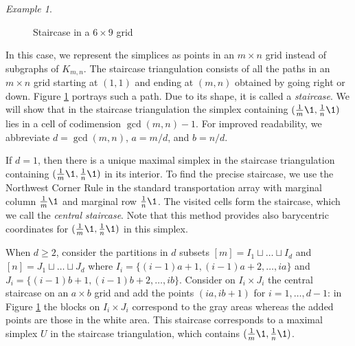 \documentclass[a4paper,12pt]{amsart}
\theoremstyle{remark}
\newtheorem{example}[theorem]{Example}
\begin{document}
\begin{example}
\begin{figure}[th]
{}
    \caption{%
      Staircase in a $6\times 9$ grid}
    \label{fig:staircase}
  \end{figure}

  In this case, we represent the simplices as points in an $m{\times}n$ grid instead of subgraphs of $K_{m,n}$.
  The staircase triangulation consists of all the paths in an $m{\times}n$ grid starting at $(1,1)$ and ending at $(m,n)$ obtained by going right or down.
  Figure \ref{fig:staircase} portrays such a path.
  Due to its shape, it is called a \emph{staircase}.
  We will show that in the staircase triangulation the simplex containing $(\tfrac{1}{m}\1,\tfrac{1}{n}\1)$ lies in a cell of codimension $\gcd(m,n)-1$.
  For improved readability, we abbreviate $d=\gcd(m,n)$, $a={m}/{d}$, and $b={n}/{d}$.
  
  If $d=1$, then there is a unique maximal simplex in the staircase triangulation containing $(\tfrac{1}{m}\1,\tfrac{1}{n}\1)$ in its interior.
  To find the precise staircase, we use the Northwest Corner Rule \cite[.1]{DantzigThapa:1997} in the standard transportation array with marginal column $\tfrac{1}{m}\1$ and marginal row $\tfrac{1}{n}\1$.
  The visited cells form the staircase, which we call the \emph{central staircase}.
  Note that this method provides also barycentric coordinates for $(\tfrac{1}{m}\1,\tfrac{1}{n}\1)$ in this simplex.
  
  When $d\geq 2$, consider the partitions in $d$ subsets $[m]=I_1\sqcup\dots\sqcup I_d$ and $[n]=J_1\sqcup\dots\sqcup J_d$ where $I_i=\{(i-1)a+1,(i-1)a+2,\dots,ia\}$ and $J_i=\{(i-1)b+1,(i-1)b+2,\dots,ib\}$.
  Consider on $I_i\times J_i$ the central staircase on an $a\times b$ grid and add the points $(ia,ib+1)$ for $i=1,\dots,d-1$: in Figure \ref{fig:staircase} the blocks on $I_i\times J_i$ correspond to the gray areas whereas the added points are those in the white area.
  This staircase corresponds to a maximal simplex $U$ in the staircase triangulation, which contains $(\tfrac{1}{m}\1,\tfrac{1}{n}\1)$.
  

\end{example}
\end{document}
